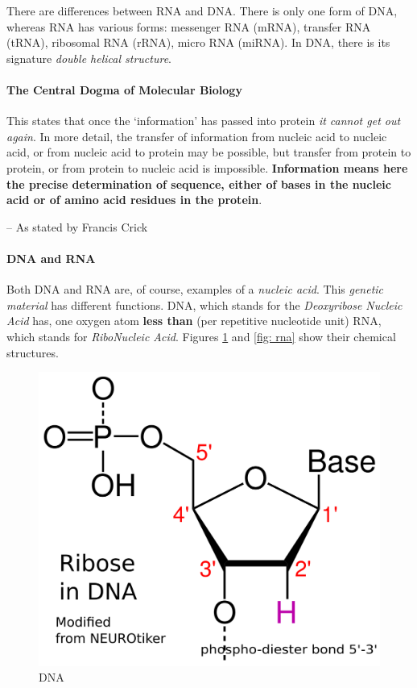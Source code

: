 \documentclass[12pt]{article}
\begin{document}
There are differences between RNA and DNA. There is only one form of DNA, whereas RNA has various forms: messenger RNA (mRNA), transfer RNA (tRNA), ribosomal RNA (rRNA), micro RNA (miRNA). In DNA, there is its signature \emph{double helical structure}. 


\paragraph{The Central Dogma of Molecular Biology}
\label{para: central-dogma}
\epigraph
{
    This states that once the `information' has passed into protein \textit{it cannot get out again}. In more detail, the transfer of information from nucleic acid to nucleic acid, or from nucleic acid to protein may be possible, but transfer from protein to protein, or from protein to nucleic acid is impossible. \textbf{Information means here the precise determination of sequence, either of bases in the nucleic acid or of amino acid residues in the protein}.
}
{
    -- As stated by Francis Crick \cite{the-central-dogma}
}

\paragraph{DNA and RNA}
Both DNA and RNA are, of course, examples of a \emph{nucleic acid}. This \emph{genetic material} has different functions. DNA, which stands for the \emph{Deoxyribose Nucleic Acid} has, one oxygen atom \textbf{less than} (per repetitive nucleotide unit) RNA, which stands for \emph{RiboNucleic Acid}. Figures \ref{fig: dna} and \ref{fig: rna} show their chemical structures.

\begin{figure}[ht!]
    \centering
    \includegraphics[width=0.5\linewidth]{dna-ribose-numbering-std-notation.png}
    \caption{DNA}
    \label{fig: dna}
\end{figure}
\end{document}
